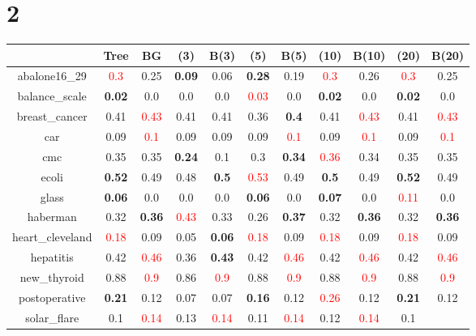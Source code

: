\documentclass{article}%
\begin{document}
\section*{2}%
\begin{tabular}{c|cccccccccc}%
\hline%
&Tree&BG&(3)&B(3)&(5)&B(5)&(10)&B(10)&(20)&B(20)\\%
\hline%
abalone16\_29&\textcolor{red}{ 
0.3
}&0.25&\textbf{0.09}&0.06&\textbf{0.28}&0.19&\textcolor{red}{ 
0.3
}&0.26&\textcolor{red}{ 
0.3
}&0.25\\%
\hline%
balance\_scale&\textbf{0.02}&0.0&0.0&0.0&\textcolor{red}{ 
0.03
}&0.0&\textbf{0.02}&0.0&\textbf{0.02}&0.0\\%
\hline%
breast\_cancer&0.41&\textcolor{red}{ 
0.43
}&0.41&0.41&0.36&\textbf{0.4}&0.41&\textcolor{red}{ 
0.43
}&0.41&\textcolor{red}{ 
0.43
}\\%
\hline%
car&0.09&\textcolor{red}{ 
0.1
}&0.09&0.09&0.09&\textcolor{red}{ 
0.1
}&0.09&\textcolor{red}{ 
0.1
}&0.09&\textcolor{red}{ 
0.1
}\\%
\hline%
cmc&0.35&0.35&\textbf{0.24}&0.1&0.3&\textbf{0.34}&\textcolor{red}{ 
0.36
}&0.34&0.35&0.35\\%
\hline%
ecoli&\textbf{0.52}&0.49&0.48&\textbf{0.5}&\textcolor{red}{ 
0.53
}&0.49&\textbf{0.5}&0.49&\textbf{0.52}&0.49\\%
\hline%
glass&\textbf{0.06}&0.0&0.0&0.0&\textbf{0.06}&0.0&\textbf{0.07}&0.0&\textcolor{red}{ 
0.11
}&0.0\\%
\hline%
haberman&0.32&\textbf{0.36}&\textcolor{red}{ 
0.43
}&0.33&0.26&\textbf{0.37}&0.32&\textbf{0.36}&0.32&\textbf{0.36}\\%
\hline%
heart\_cleveland&\textcolor{red}{ 
0.18
}&0.09&0.05&\textbf{0.06}&\textcolor{red}{ 
0.18
}&0.09&\textcolor{red}{ 
0.18
}&0.09&\textcolor{red}{ 
0.18
}&0.09\\%
\hline%
hepatitis&0.42&\textcolor{red}{ 
0.46
}&0.36&\textbf{0.43}&0.42&\textcolor{red}{ 
0.46
}&0.42&\textcolor{red}{ 
0.46
}&0.42&\textcolor{red}{ 
0.46
}\\%
\hline%
new\_thyroid&0.88&\textcolor{red}{ 
0.9
}&0.86&\textcolor{red}{ 
0.9
}&0.88&\textcolor{red}{ 
0.9
}&0.88&\textcolor{red}{ 
0.9
}&0.88&\textcolor{red}{ 
0.9
}\\%
\hline%
postoperative&\textbf{0.21}&0.12&0.07&0.07&\textbf{0.16}&0.12&\textcolor{red}{ 
0.26
}&0.12&\textbf{0.21}&0.12\\%
\hline%
solar\_flare&0.1&\textcolor{red}{ 
0.14
}&0.13&\textcolor{red}{ 
0.14
}&0.11&\textcolor{red}{ 
0.14
}&0.12&\textcolor{red}{ 
0.14
}&0.1&\textcolor{red}{ 
}
\end{tabular}
\end{document}
